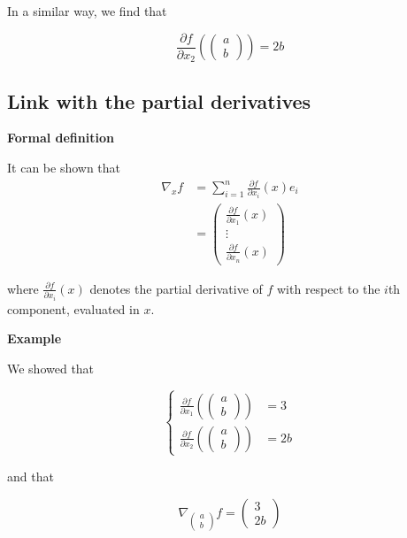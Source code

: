 \documentclass{tufte-handout}
\begin{document}
In a similar way, we find that

$$ \frac{\partial f}{\partial x_2}(\begin{pmatrix}
a \\ b
\end{pmatrix}) = 2b $$

 \subsection{Link with the partial derivatives}

 \textbf{Formal definition}

 It can be shown that
 \begin{align*}
  \nabla_x f &= \sum_{i=1}^{n} \frac{\partial f}{\partial x_i}(x) e_i\\
  			&= \begin{pmatrix}
  			\frac{\partial f}{\partial x_1}(x)\\
            \vdots\\
            \frac{\partial f}{\partial x_n}(x)
  			\end{pmatrix}
 \end{align*}


 where $ \frac{\partial f}{\partial x_i} (x) $ denotes the partial derivative of $ f $ with respect to the $ i $th component, evaluated in $ x $.

 \textbf{Example}

 We showed that

$$ \begin{cases}
\frac{\partial f}{\partial x_1}(\begin{pmatrix}
a\\b
\end{pmatrix}) &= 3\\
\frac{\partial f}{\partial x_2}(\begin{pmatrix}
a \\ b
\end{pmatrix}) &= 2b
\end{cases}$$

and that

$$ \nabla_{\begin{pmatrix}
a \\ b
\end{pmatrix}}f = \begin{pmatrix}
3 \\ 2b
\end{pmatrix} $$
\end{document}
